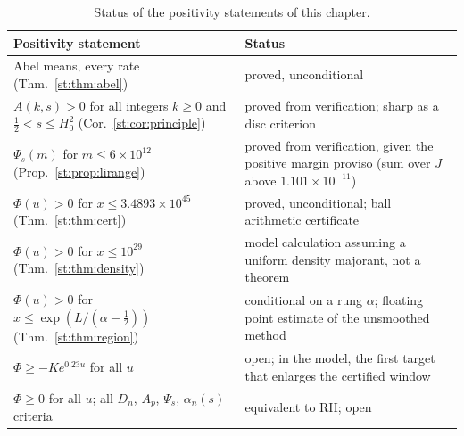 \begin{table}[h]\centering\small
\begin{tabular}{p{}p{}}
\toprule
Positivity statement & Status\\
\midrule
Abel means, every rate (Thm.\ \ref{st:thm:abel}) & proved, unconditional\\
$A(k,s)>0$ for all integers $k\ge0$ and $\tfrac12<s\le H_0^2$ (Cor.\ \ref{st:cor:principle}) & proved from verification; sharp as a disc criterion\\
$\Psi_s(m)$ for $m\le6\times10^{12}$ (Prop.\ \ref{st:prop:lirange}) & proved from verification, given the positive margin proviso (sum over $J$ above $1.101\times10^{-11}$)\\
$\Phi(u)>0$ for $x\le3.4893\times10^{45}$ (Thm.\ \ref{st:thm:cert}) & proved, unconditional; ball arithmetic certificate\\
$\Phi(u)>0$ for $x\le10^{29}$ (Thm.\ \ref{st:thm:density}) & model calculation assuming a uniform density majorant, not a theorem\\
$\Phi(u)>0$ for $x\le\exp(L/(\alpha-\frac12))$ (Thm.\ \ref{st:thm:region}) & conditional on a rung $\alpha$; floating point estimate of the unsmoothed method\\
$\Phi\ge-Ke^{0.23u}$ for all $u$ & open; in the model, the first target that enlarges the certified window\\
$\Phi\ge0$ for all $u$; all $D_n$, $A_p$, $\Psi_s$, $\alpha_n(s)$ criteria & equivalent to RH; open\\
\bottomrule
\end{tabular}
\caption{Status of the positivity statements of this chapter.}\label{st:tab:status}
\end{table}


